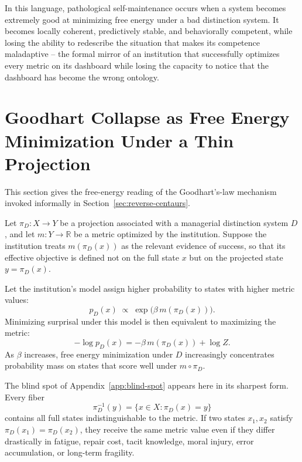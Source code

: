 \documentclass[11pt]{article}
\theoremstyle{plain}
\begin{document}
In this language, pathological self-maintenance occurs when a system becomes extremely good at minimizing free energy under a bad distinction system. It becomes locally coherent, predictively stable, and behaviorally competent, while losing the ability to redescribe the situation that makes its competence maladaptive -- the formal mirror of an institution that successfully optimizes every metric on its dashboard while losing the capacity to notice that the dashboard has become the wrong ontology.

\section{Goodhart Collapse as Free Energy Minimization Under a Thin Projection}
\label{app:goodhart-collapse}

\noindent This section gives the free-energy reading of the Goodhart's-law mechanism invoked informally in Section~\ref{sec:reverse-centaurs}.

Let $\pi_D : X \to Y$ be a projection associated with a managerial distinction system $D$, and let $m : Y \to \mathbb{R}$ be a metric optimized by the institution. Suppose the institution treats $m(\pi_D(x))$ as the relevant evidence of success, so that its effective objective is defined not on the full state $x$ but on the projected state $y = \pi_D(x)$.

Let the institution's model assign higher probability to states with higher metric values:
\[
p_D(x) \;\propto\; \exp\big(\beta\, m(\pi_D(x))\big).
\]
Minimizing surprisal under this model is then equivalent to maximizing the metric:
\[
-\log p_D(x) = -\beta\, m(\pi_D(x)) + \log Z.
\]
As $\beta$ increases, free energy minimization under $D$ increasingly concentrates probability mass on states that score well under $m \circ \pi_D$.

The blind spot of Appendix~\ref{app:blind-spot} appears here in its sharpest form. Every fiber
\[
\pi_D^{-1}(y) = \{x \in X : \pi_D(x) = y\}
\]
contains all full states indistinguishable to the metric. If two states $x_1, x_2$ satisfy $\pi_D(x_1) = \pi_D(x_2)$, they receive the same metric value even if they differ drastically in fatigue, repair cost, tacit knowledge, moral injury, error accumulation, or long-term fragility.
\end{document}
